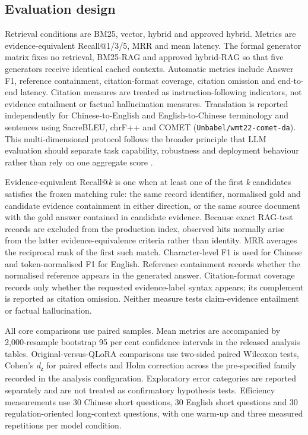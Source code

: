 \subsection{Evaluation design}

Retrieval conditions are BM25, vector, hybrid and approved hybrid. Metrics are evidence-equivalent Recall@1/3/5, MRR and mean latency. The formal generator matrix fixes no retrieval, BM25-RAG and approved hybrid-RAG so that five generators receive identical cached contexts. Automatic metrics include Answer F1, reference containment, citation-format coverage, citation omission and end-to-end latency. Citation measures are treated as instruction-following indicators, not evidence entailment or factual hallucination measures. Translation is reported independently for Chinese-to-English and English-to-Chinese terminology and sentences using SacreBLEU, chrF++ and COMET (\texttt{Unbabel/wmt22-comet-da}). This multi-dimensional protocol follows the broader principle that LLM evaluation should separate task capability, robustness and deployment behaviour rather than rely on one aggregate score \citep{chang2024survey}.

Evidence-equivalent Recall@\emph{k} is one when at least one of the first \emph{k} candidates satisfies the frozen matching rule: the same record identifier, normalised gold and candidate evidence containment in either direction, or the same source document with the gold answer contained in candidate evidence. Because exact RAG-test records are excluded from the production index, observed hits normally arise from the latter evidence-equivalence criteria rather than identity. MRR averages the reciprocal rank of the first such match. Character-level F1 is used for Chinese and token-normalised F1 for English. Reference containment records whether the normalised reference appears in the generated answer. Citation-format coverage records only whether the requested evidence-label syntax appears; its complement is reported as citation omission. Neither measure tests claim-evidence entailment or factual hallucination.

All core comparisons use paired samples. Mean metrics are accompanied by 2,000-resample bootstrap 95 per cent confidence intervals in the released analysis tables. Original-versus-QLoRA comparisons use two-sided paired Wilcoxon tests, Cohen's \emph{d}\textsubscript{z} for paired effects and Holm correction across the pre-specified family recorded in the analysis configuration. Exploratory error categories are reported separately and are not treated as confirmatory hypothesis tests. Efficiency measurements use 30 Chinese short questions, 30 English short questions and 30 regulation-oriented long-context questions, with one warm-up and three measured repetitions per model condition.

